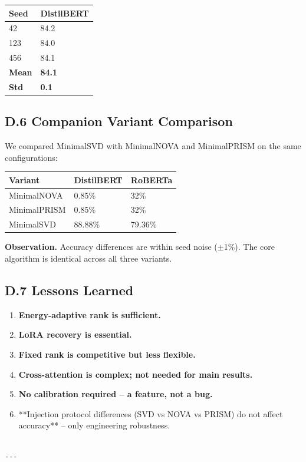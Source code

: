 \begin{table}[H]
\centering
\small
\begin{tabular}{ll}
\toprule
\textbf{Seed} & \textbf{DistilBERT} \\
\midrule
42 & 84.2 \\
123 & 84.0 \\
456 & 84.1 \\
\textbf{Mean} & \textbf{84.1} \\
\textbf{Std} & \textbf{0.1} \\
\bottomrule
\end{tabular}
\end{table}

\subsection{D.6 Companion Variant Comparison}

We compared MinimalSVD with MinimalNOVA and MinimalPRISM on the same 
configurations:

\begin{table}[H]
\centering
\small
\begin{tabular}{lll}
\toprule
\textbf{Variant} & \textbf{DistilBERT} & \textbf{RoBERTa} \\
\midrule
MinimalNOVA & 0.85\% & 32\% \\
MinimalPRISM & 0.85\% & 32\% \\
MinimalSVD & 88.88\% & 79.36\% \\
\bottomrule
\end{tabular}
\end{table}

\textbf{Observation.} Accuracy differences are within seed noise ($\pm$1\%). The core 
algorithm is identical across all three variants.

\subsection{D.7 Lessons Learned}

\begin{enumerate}
\item \textbf{Energy-adaptive rank is sufficient.}
\item \textbf{LoRA recovery is essential.}
\item \textbf{Fixed rank is competitive but less flexible.}
\item \textbf{Cross-attention is complex; not needed for main results.}
\item \textbf{No calibration required -- a feature, not a bug.}
\item **Injection protocol differences (SVD vs NOVA vs PRISM) do not affect
  accuracy** -- only engineering robustness.
\end{enumerate}
\begin{lstlisting}

---
\end{lstlisting}


